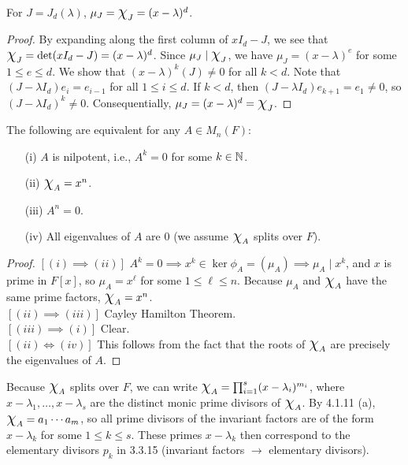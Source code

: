 \documentclass[11pt]{book}
\theoremstyle{definition}   \newtheorem{defn}[counter]{Definition} %
\newcommand{\Chi}{\mbox{\Large $\chi$}}
\DeclareMathOperator{\ra}{\rightarrow}   \DeclareMathOperator{\Poly}{\mathbf{P}}   \DeclareMathOperator{\spn}{\textnormal{span}}   \DeclareMathOperator{\aut}{\textnormal{Aut}}
\newcommand{\vs}{\vspace{8pt}}
\numberwithin{counter}{chapter}
\begin{document}
\vs

\begin{lemma}
For $J = J_d(\lambda)$, $\mu_J = \Chi_J = (x-\lambda)^d$.
\end{lemma}

\begin{proof}
By expanding along the first column of $xI_d - J$, we see that $\Chi_J = \det(xI_d - J) = (x-\lambda)^d$. Since $\mu_J \mid \Chi_J$, we have $\mu_J = (x-\lambda)^e$ for some $1 \leq e \leq d$. We show that $(x-\lambda)^k(J) \ne 0$ for all $k < d$. Note that $(J-\lambda I_d)e_i = e_{i-1}$ for all $1 \leq i \leq d$. If $k < d$, then $(J-\lambda I_d)e_{k+1} = e_1 \ne 0$, so $(J-\lambda I_d)^k \ne 0$. Consequentially, $\mu_J = (x-\lambda)^d = \Chi_J$. 
\end{proof}

\vs

\begin{lemma}
The following are equivalent for any $A \in M_n(F)$:
\begin{enumerate}
\item[(i)] $A$ is nilpotent, i.e., $A^k = 0$ for some $k \in \operatorname{\mathbb{N}}$. 
\item[(ii)] $\Chi_A = x^n$.
\item[(iii)] $A^n = 0$.
\item[(iv)] All eigenvalues of $A$ are 0 (we assume $\Chi_A$ splits over $F$). 
\end{enumerate}
\end{lemma}

\begin{proof}
$[(i) \implies (ii)]$ $A^k = 0 \implies x^k \in \ker \phi_A = (\mu_A) \implies \mu_A \mid x^k$, and $x$ is prime in $F[x]$, so $\mu_A = x^\ell$ for some $1 \leq \ell \leq n$. Because $\mu_A$ and $\Chi_A$ have the same prime factors, $\Chi_A = x^n$. \\

$[(ii) \implies (iii)]$ Cayley Hamilton Theorem. \\

$[(iii) \implies (i)]$ Clear. \\

$[(ii) \iff (iv)]$ This follows from the fact that the roots of $\Chi_A$ are precisely the eigenvalues of $A$. 
\end{proof}

\vs

Because $\Chi_A$ splits over $F$, we can write $\Chi_A = \prod_{i=1}^s (x-\lambda_i)^{m_i}$, where $x-\lambda_1,\dots,x-\lambda_s$ are the distinct monic prime divisors of $\Chi_A$. By 4.1.11 (a), $\Chi_A = a_1 \cdots a_m$, so all prime divisors of the invariant factors are of the form $x-\lambda_k$ for some $1 \leq k \leq s$. These primes $x-\lambda_k$ then correspond to the elementary divisors $p_k$ in 3.3.15 (invariant factors $\ra$ elementary divisors). \\
\end{document}
